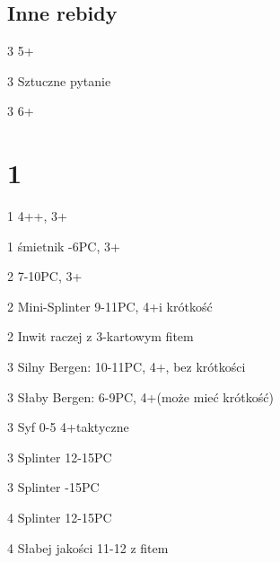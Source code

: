 \documentclass[12pt, a4paper]{article}
\begin{document}
\subsection*{Inne rebidy}
\sequence{{1\diams}{1\hearts}{3\diams}}
\begin{options}[2]
    \item[3\hearts] 5+\hearts \gf \imp
\end{options}

\sequence{{1\diams}{1\spades}{3\diams}}
\begin{options}[2]
    \item[3\hearts] Sztuczne pytanie
    \item[3\spades] 6+\spades 
\end{options}

\pagebreak
\section*{1\hearts}

\sequence{{1\hearts}}
\begin{options}[2]
    \item[1\spades] 4+\spades {}+\spades, 3+\hearts  \gf
    \item[1\nt] \nf śmietnik -6PC, 3+\hearts
    \item[2\hearts] 7-10PC, 3+\hearts
    \item[2\spades] Mini-Splinter 9-11PC, 4+\hearts i krótkość \br
    \item[2\nt] Inwit raczej z 3-kartowym fitem  
    \item[3\clubs] Silny Bergen: 10-11PC, 4+\hearts, bez krótkości
    \item[3\diams] Słaby Bergen: 6-9PC, 4+\hearts (może mieć krótkość) \br
    \item[3\hearts] Syf 0-5 4+\hearts taktyczne
    \item[3\spades] Splinter 12-15PC
    \item[3\nt] Splinter -15PC   
    \item[4\clubs] Splinter 12-15PC
    \item[4\diams] Słabej jakości 11-12 z fitem  
\end{options}
\end{document}
